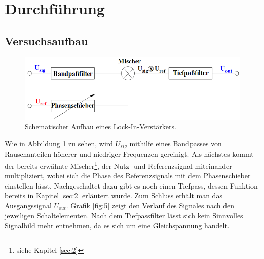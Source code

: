 \section{Durchführung}
\subsection{Versuchsaufbau}
\label{sec:3.1}
\begin{figure}
  \centering
  \includegraphics[scale=0.4]{aufbau.png}
  \caption{Schematischer Aufbau eines Lock-In-Verstärkers.}
  \label{fig:2}
\end{figure}
Wie in Abbildung \ref{fig:2} zu sehen, wird $U_{sig}$ mithilfe eines Bandpasses
von Rauschanteilen höherer und niedriger Frequenzen gereinigt. Als nächstes kommt
der bereits erwähnte Mischer\footnote{siehe Kapitel \ref{sec:2}}, der Nutz- und
Referenzsignal miteinander multipliziert, wobei sich die Phase des Referenzsignals
mit dem Phasenschieber einstellen lässt. Nachgeschaltet dazu gibt es noch einen
Tiefpass, dessen Funktion bereits in Kapitel \ref{sec:2} erläutert wurde. Zum
Schluss erhält man das Ausgangssignal $U_ {out}$. Grafik \ref{fig:5} zeigt den Verlauf
des Signales nach den jeweiligen Schaltelementen. Nach dem Tiefpassfilter lässt sich
kein Sinnvolles Signalbild mehr entnehmen, da es sich um eine Gleichspannung handelt.
